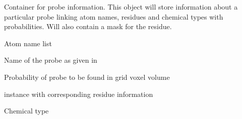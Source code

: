 \documentclass[letterpaper,10pt,english]{sphinxmanual}
\begin{document}

\begin{fulllineitems}
\label{containers:pyMDMix.containers.Probe}
Container for probe information. This object will store information about a particular probe linking
atom names, residues and chemical types with probabilities. Will also contain a mask for the residue.

\begin{fulllineitems}
\label{containers:pyMDMix.containers.Probe.atoms}
Atom name list

\end{fulllineitems}


\begin{fulllineitems}
\label{containers:pyMDMix.containers.Probe.name}
Name of the probe as given in 

\end{fulllineitems}


\begin{fulllineitems}
\label{containers:pyMDMix.containers.Probe.p}
Probability of probe to be found in grid voxel volume

\end{fulllineitems}


\begin{fulllineitems}
\label{containers:pyMDMix.containers.Probe.residue}
{\hyperref[containers:pyMDMix.containers.Residue]{}} instance with corresponding residue information

\end{fulllineitems}


\begin{fulllineitems}
\label{containers:pyMDMix.containers.Probe.type}
Chemical type

\end{fulllineitems}


\end{fulllineitems}
\end{document}
